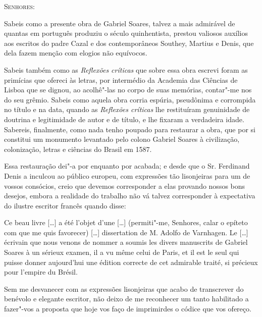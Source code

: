 \begin{linenumbers}

\textsc{Senhores:}

Sabeis como a presente obra de Gabriel Soares, talvez a mais admirável 
de quantas em português produziu o século quinhentista, 
prestou valiosos auxílios aos escritos do padre Cazal e dos 
contemporâneos Southey, Martius e Denis, que dela fazem menção com 
elogios não equívocos. 

Sabeis também como as \textit{Reflexões críticas} que sobre essa obra 
escrevi foram as primícias que ofereci às letras, por intermédio da 
Academia das Ciências de Lisboa que se dignou, ao acolhê"-las no corpo 
de suas memórias, contar"-me nos do seu grêmio. Sabeis como aquela obra corria espúria, pseudônima e corrompida no título e na data, quando 
as \textit{Reflexões críticas} lhe restituíram genuinidade de doutrina e    
legitimidade de autor e de título, e lhe fixaram a verdadeira idade. 
Sabereis, finalmente, como nada tenho poupado para restaurar a obra, 
que por si constitui um monumento levantado pelo colono Gabriel 
Soares à civilização, colonização, letras e ciências do Brasil em 1587.

Essa restauração dei"-a por enquanto por acabada; e desde que o Sr. 
Ferdinand Denis a inculcou ao público europeu, com expressões tão 
lisonjeiras para um de vossos consócios, creio que devemos 
corresponder a elas provando nossos bons desejos, embora a realidade 
do trabalho não vá talvez corresponder à expectativa do ilustre escritor 
francês quando disse: 

\begin{hedraquote}
Ce beau livre [\ldots] a été l'objet d'une [\ldots] 
(permiti"-me, Senhores, calar o epíteto com que me quis favorecer) [\ldots] 
dissertation de M. Adolfo de Varnhagen. Le [\ldots] écrivain que nous 
venons de nommer a soumis les divers manuscrits de Gabriel Soares à un 
sérieux examen, il a vu même celui de Paris, et il est le seul qui puisse
donner aujourd'hui une édition correcte de cet admirable traité, si 
précieux pour l'empire du Brésil.
\end{hedraquote}

Sem me desvanecer com as expressões lisonjeiras que acabo de 
transcrever do benévolo e elegante escritor, não deixo de me reconhecer 
um tanto habilitado a fazer"-vos a proposta que hoje vos faço de 
imprimirdes o códice que vos ofereço.


\end{linenumbers}
